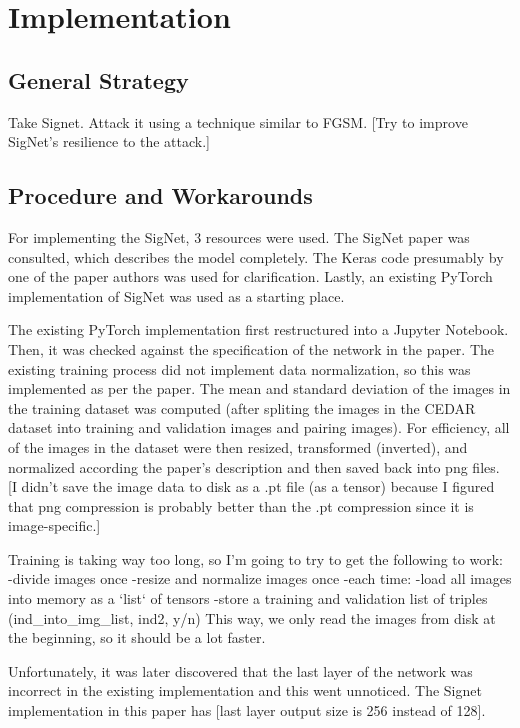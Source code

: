 \section{Implementation}\label{sec:implementation}


\subsection{General Strategy}

Take Signet.
Attack it using a technique similar to FGSM.
[Try to improve SigNet's resilience to the attack.]


\subsection{Procedure and Workarounds}

For implementing the SigNet, 3 resources were used.
The SigNet paper was consulted, which describes the model completely\cite{sig_net}.
The Keras code presumably by one of the paper authors was used for clarification\cite{GitHub_sounakdey}.
Lastly, an existing PyTorch implementation of SigNet was used as a starting place\cite{GitHub_signet_pytorch}.

The existing PyTorch implementation first restructured into a Jupyter Notebook.
Then, it was checked against the specification of the network in the paper.
The existing training process did not implement data normalization, so this was implemented as per the paper.
The mean and standard deviation of the images in the training dataset was computed (after spliting the images in the CEDAR dataset into training and validation images and pairing images).
For efficiency, all of the images in the dataset were then resized, transformed (inverted), and normalized according the paper's description and then saved back into png files.
[I didn't save the image data to disk as a .pt file (as a tensor) because I figured that png compression is probably better than the .pt compression since it is image-specific.]

Training is taking way too long, so I'm going to try to get the following to work:
-divide images once
-resize and normalize images once
-each time:
    -load all images into memory as a `list` of tensors
    -store a training and validation list of triples (ind_into_img_list, ind2, y/n)
This way, we only read the images from disk at the beginning, so it should be a lot faster.


Unfortunately, it was later discovered that the last layer of the network was incorrect in the existing implementation and this went unnoticed.
The Signet implementation in this paper has [last layer output size is 256 instead of 128].

